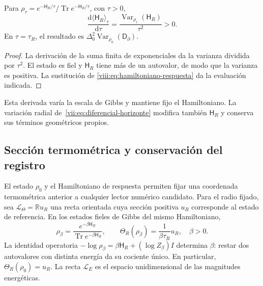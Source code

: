 \begin{corollary}
\label{viii:cor:respuesta-escala-termica}
Para \(\rho_\tau=e^{-\mathsf H_R/\tau}/
\operatorname{Tr}e^{-\mathsf H_R/\tau}\), con \(\tau>0\),
\begin{equation}
 \frac{\mathrm d\langle\mathsf H_R\rangle_\tau}{\mathrm d\tau}
 =\frac{\operatorname{Var}_{\rho_\tau}(\mathsf H_R)}{\tau^2}>0.
 \label{viii:eq:susceptibilidad-termica}
\end{equation}
En \(\tau=\tau_R\), el resultado es
\(\Delta_0^2\operatorname{Var}_{\rho_0}(\mathsf D_\partial)\).
\end{corollary}
\begin{proof}
La derivación de la suma finita de exponenciales da la varianza dividida
por \(\tau^2\). El estado es fiel y \(\mathsf H_R\) tiene más de
un autovalor, de modo que la varianza es positiva. La sustitución de
\eqref{viii:eq:hamiltoniano-respuesta} da la evaluación indicada.
\end{proof}

Esta derivada varía la escala de Gibbs y mantiene fijo el Hamiltoniano.
La variación radial de~\eqref{vii:eq:diferencial-horizonte} modifica
también \(\mathsf H_R\) y conserva sus términos geométricos propios.

\subsection{Sección termométrica y conservación del registro}
\label{viii:subsec:seccion-termometrica-registro}

El estado \(\rho_0\) y el Hamiltoniano de respuesta permiten fijar una
coordenada termométrica anterior a cualquier lector numérico candidato.
Para el radio fijado, sea \(\mathcal L_\Theta=\mathbb R u_R\) una
recta orientada cuya sección positiva \(u_R\) corresponde al estado
de referencia. En los estados fieles de Gibbs del mismo Hamiltoniano,
\begin{equation}
 \rho_\beta=\frac{e^{-\beta\mathsf H_R}}
                  {\operatorname{Tr}e^{-\beta\mathsf H_R}},\qquad
 \Theta_R(\rho_\beta)=\frac{1}{\beta\tau_R}u_R,
 \quad \beta>0.
 \label{viii:eq:lector-termometrico}
\end{equation}
La identidad operatoria
\(-\log\rho_\beta=\beta\mathsf H_R+(\log Z_\beta)I\)
determina \(\beta\): restar dos autovalores con distinta energía
da su cociente único. En particular,
\(\Theta_R(\rho_0)=u_R\).
La recta \(\mathcal L_E\) es el espacio unidimensional de las
magnitudes energéticas.

